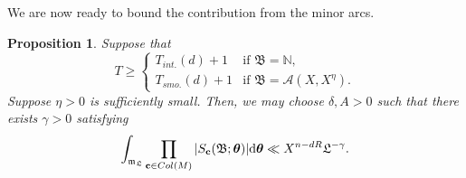 \documentclass[reqno, 12pt, reqno]{amsart}
\numberwithin{equation}{section}
\newtheorem{proposition}[theorem]{Proposition}
\renewcommand{\geq}{\geqslant}
\renewcommand{\c}{\mathbf{c}}
\renewcommand{\=}{\equiv}
\begin{document}
We are now ready to bound the contribution from the minor arcs.
\begin{proposition}\label{prop:minor}
Suppose that
$$
T \geq
\begin{cases}
                  T_{int.}(d) + 1 & \mbox{if }  \mathfrak{B} = \mathbb{N},  \\
                  T_{smo.}(d) + 1  & \mbox{if }  \mathfrak{B} = \mathcal{A}(X, X^{\eta}).
               \end{cases}
$$
Suppose $\eta > 0$ is sufficiently small.
Then, we may choose $\delta, A > 0$ such that there exists $\gamma > 0$ satisfying
$$
\int_{\mathfrak{m}_\mathfrak{L}}  \prod_{\c \in \textnormal{Col}(M)} |S_{\c}(\mathfrak{B};  \boldsymbol{\theta})|  \mathrm{d}\boldsymbol{\theta}
\ll
X^{n - d R} \mathfrak{L}^{- \gamma}.
$$
\end{proposition}
\end{document}
